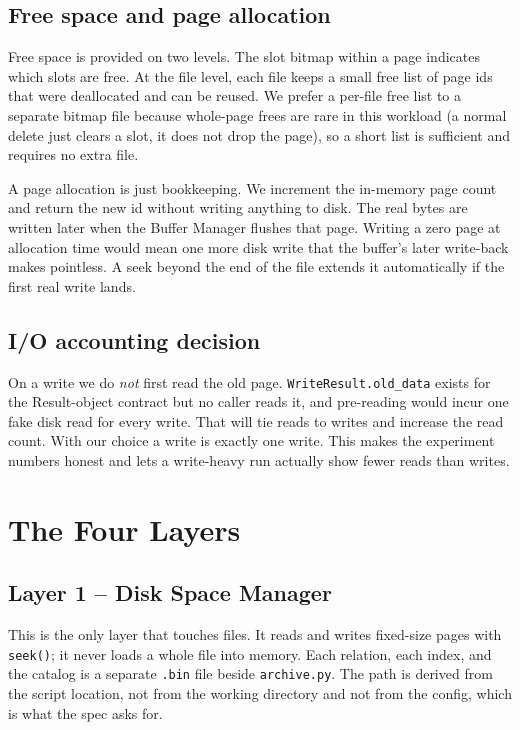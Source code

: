 \documentclass[12pt]{article}
\begin{document}
\subsection{Free space and page allocation}

Free space is provided on two levels. The slot bitmap within a page indicates
which slots are free. At the file level, each file keeps a small free list
of page ids that were deallocated and can be reused. We prefer a per-file
free list to a separate bitmap file because whole-page frees are rare in
this workload (a normal delete just clears a slot, it does not drop the
page), so a short list is sufficient and requires no extra file.

A page allocation is just bookkeeping. We increment the in-memory page count and
return the new id without writing anything to disk. The real bytes are
written later when the Buffer Manager flushes that page. Writing a zero
page at allocation time would mean one more disk write that the buffer's
later write-back makes pointless. A seek beyond the end of the file extends
it automatically if the first real write lands.

\subsection{I/O accounting decision}

On a write we do \emph{not} first read the old page.
\texttt{WriteResult.old\_data} exists for the Result-object contract but no
caller reads it, and pre-reading would incur one fake disk read for every
write. That will tie reads to writes and increase the read count. With our
choice a write is exactly one write. This makes the experiment numbers
honest and lets a write-heavy run actually show fewer reads than writes.

\section{The Four Layers}

\subsection{Layer 1 -- Disk Space Manager}

This is the only layer that touches files. It reads and writes fixed-size
pages with \texttt{seek()}; it never loads a whole file into memory. Each
relation, each index, and the catalog is a separate \texttt{.bin} file
beside \texttt{archive.py}. The path is derived from the script location, not
from the working directory and not from the config, which is what the spec
asks for.
\end{document}
